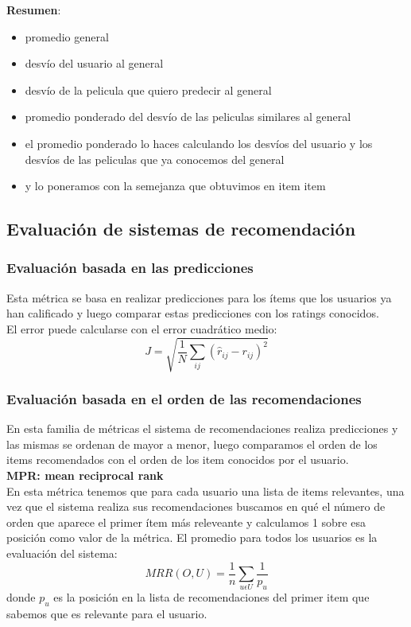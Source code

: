 \documentclass[titlepage,a4paper]{article}
\begin{document}
\textbf{Resumen}:
\begin{itemize}
\item promedio general
\item desvío del usuario al general
\item desvío de la pelicula que quiero predecir al general
\item promedio ponderado del desvío de las peliculas similares al general
\item el promedio ponderado lo haces calculando los desvíos del usuario y los desvíos de las peliculas que ya conocemos del general
\item y lo poneramos con la semejanza que obtuvimos en item item
\end{itemize}
\subsection*{Evaluación de sistemas de recomendación}
\subsubsection*{Evaluación basada en las predicciones}
Esta métrica se basa en realizar predicciones para los ítems que los usuarios ya han calificado y luego comparar estas predicciones con los ratings conocidos. \\

El error puede calcularse con el error cuadrático medio: $$ J = \sqrt{\frac{1}{N}\sum_{ij}(\widehat{r}_{ij}- r_{ij} )^2}$$  

\subsubsection*{Evaluación basada en el orden de las recomendaciones}
En esta familia de métricas el sistema de recomendaciones realiza predicciones y las mismas se ordenan de mayor a menor, luego comparamos el orden de los items recomendados con el orden de los item conocidos por el usuario. \\

\textbf{MPR: mean reciprocal rank}\\

En esta métrica tenemos que para cada usuario una lista de items relevantes, una vez que el sistema realiza sus recomendaciones buscamos en qué el número de orden que aparece el primer ítem más releveante y calculamos 1 sobre esa posición como valor de la métrica.  El promedio para todos los usuarios es la evaluación del sistema: $$MRR(O,U) = \frac{1}{n}\sum_{u\epsilon U} \frac{1}{p_u}$$ donde $p_u$ es la posición en la lista de recomendaciones del primer item que sabemos que es relevante para el usuario. \\
\end{document}
